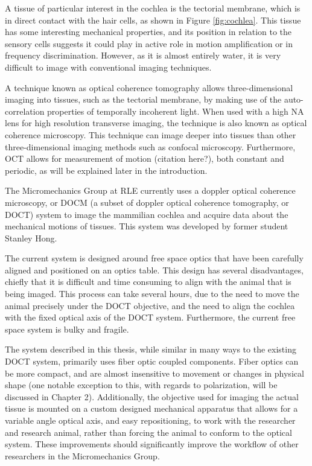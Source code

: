 A tissue of particular interest in the cochlea is the tectorial membrane, which is in direct contact with the hair cells, as shown in Figure \ref{fig:cochlea}. This tissue has some interesting mechanical properties, and its position in relation to the sensory cells suggests it could play in active role in motion amplification or in frequency discrimination. However, as it is almost entirely water, it is very difficult to image with conventional imaging techniques.

A technique known as optical coherence tomography allows three-dimensional imaging into tissues, such as the tectorial membrane, by making use of the auto-correlation properties of temporally incoherent light. When used with a high NA lens for high resolution transverse imaging, the technique is also known as optical coherence microscopy. This technique can image deeper into tissues than other three-dimensional imaging methods such as confocal microscopy. Furthermore, OCT allows for measurement of motion (citation here?), both constant and periodic, as will be explained later in the introduction.

The Micromechanics Group at RLE currently uses a doppler optical coherence microscopy, or DOCM (a subset of doppler optical coherence tomography, or DOCT) system to image the mammilian cochlea and acquire data about the mechanical motions of tissues. This system was developed by former student Stanley Hong. \cite{hong}

The current system is designed around free space optics that have been carefully aligned and positioned on an optics table. This design has several disadvantages, chiefly that it is difficult and time consuming to align with the animal that is being imaged. This process can take several hours, due to the need to move the animal precisely under the DOCT objective, and the need to align the cochlea with the fixed optical axis of the DOCT system. Furthermore, the current free space system is bulky and fragile.

The system described in this thesis, while similar in many ways to the existing DOCT system, primarily uses fiber optic coupled components. Fiber optics can be more compact, and are almost insensitive to movement or changes in physical shape (one notable exception to this, with regards to polarization, will be discussed in Chapter 2). Additionally, the objective used for imaging the actual tissue is mounted on a custom designed mechanical apparatus that allows for a variable angle optical axis, and easy repositioning, to work with the researcher and research animal, rather than forcing the animal to conform to the optical system. These improvements should significantly improve the workflow of other researchers in the Micromechanics Group.

